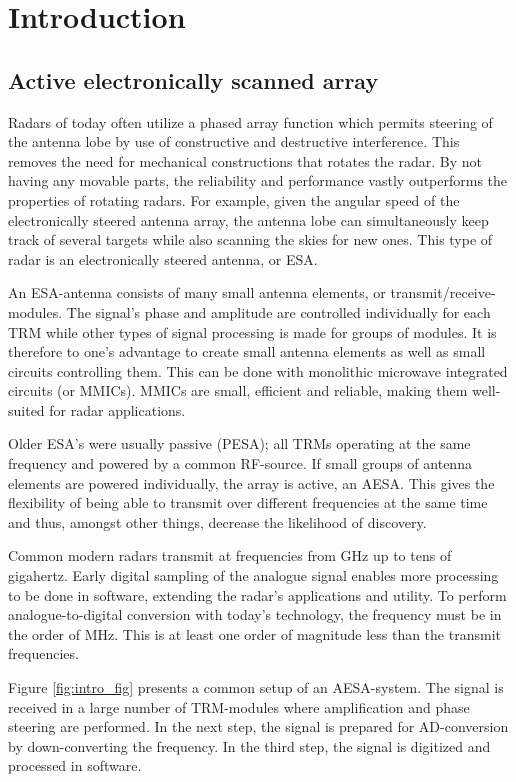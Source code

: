 \chapter{Introduction}
	\section{Active electronically scanned array}
		Radars of today often utilize a phased array function which permits steering of the antenna lobe by use of constructive and destructive interference. This removes the need for mechanical constructions that rotates the radar. By not having any movable parts, the reliability and performance vastly outperforms the properties of rotating radars. For example, given the angular speed of the electronically steered antenna array, the antenna lobe can simultaneously keep track of several targets while also scanning the skies for new ones. This type of radar is an electronically steered antenna, or ESA.\autocite{web:navair02}

		An ESA-antenna consists of many small antenna elements, or transmit/receive-modules. The signal's phase and amplitude are controlled individually for each TRM while other types of signal processing is made for groups of modules. It is therefore to one's advantage to create small antenna elements as well as small circuits controlling them. This can be done with monolithic microwave integrated circuits (or MMICs). MMICs are small, efficient and reliable, making them well-suited for radar applications.\autocite{stimson98}

		Older ESA's were usually passive (PESA); all TRMs operating at the same frequency and powered by a common RF-source. If small groups of antenna elements are powered individually, the array is active, an AESA. This gives the flexibility of being able to transmit over different frequencies at the same time and thus, amongst other things, decrease the likelihood of discovery.\autocites{oliner72}

		Common modern radars transmit at frequencies from \unit[1]{GHz} up to tens of gigahertz. Early digital sampling of the analogue signal enables more processing to be done in software, extending the radar's applications and utility. To perform analogue-to-digital conversion with today's technology, the frequency must be in the order of \unit[100]{MHz}. This is at least one order of magnitude less than the transmit frequencies.

		Figure \ref{fig:intro_fig} presents a common setup of an AESA-system. The signal is received in a large number of TRM-modules where amplification and phase steering are performed. In the next step, the signal is prepared for AD-conversion by down-converting the frequency. In the third step, the signal is digitized and processed in software.


